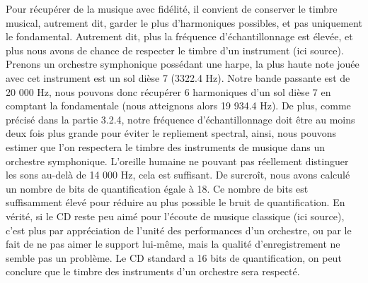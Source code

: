 Pour récupérer de la musique avec fidélité, il convient de conserver le timbre musical, autrement dit, garder le plus d'harmoniques possibles, et pas uniquement le fondamental. Autrement dit, plus la fréquence d'échantillonnage est élevée, et plus nous avons de chance de respecter le timbre d'un instrument (ici source). Prenons un orchestre symphonique possédant une harpe, la plus haute note jouée avec cet instrument est un sol dièse 7 (3322.4 Hz). Notre bande passante est de 20 000 Hz, nous pouvons donc récupérer 6 harmoniques d'un sol dièse 7 en comptant la fondamentale (nous atteignons alors 19 934.4 Hz). De plus, comme précisé dans la partie 3.2.4, notre fréquence d'échantillonnage doit être au moins deux fois plus grande pour éviter le repliement spectral, ainsi, nous pouvons estimer que l'on respectera le timbre des instruments de musique dans un orchestre symphonique. L'oreille humaine ne pouvant pas réellement distinguer les sons au-delà de 14 000 Hz, cela est suffisant. De surcroît, nous avons calculé un nombre de bits de quantification égale à 18. Ce nombre de bits est suffisamment élevé pour réduire au plus possible le bruit de quantification. En vérité, si le CD reste peu aimé pour l'écoute de musique classique (ici source), c'est plus par appréciation de l'unité des performances d'un orchestre, ou par le fait de ne pas aimer le support  lui-même, mais la qualité d'enregistrement ne semble pas un problème. Le CD standard a 16 bits de quantification, on peut conclure que le timbre des instruments d'un orchestre sera respecté.

